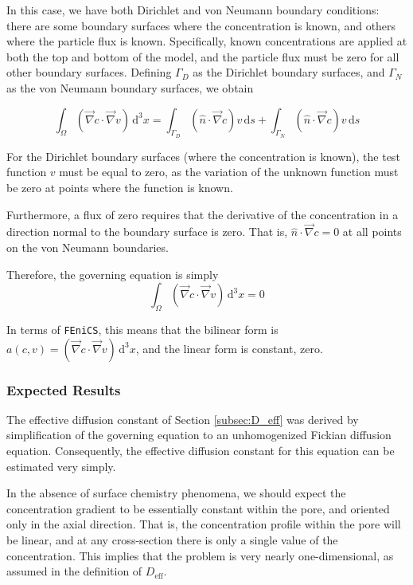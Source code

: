 In this case, we have both Dirichlet and von Neumann boundary conditions:
there are some boundary surfaces where the concentration is known,
and others where the particle flux is known.
Specifically, known concentrations are applied at both the top and bottom of the model,
and the particle flux must be zero for all other boundary surfaces.
Defining $\Gamma_D$ as the Dirichlet boundary surfaces,
and $\Gamma_N$ as the von Neumann boundary surfaces, we obtain

\begin{equation}
\int_{\Omega} \left( \vec{\nabla}c \cdot \vec{\nabla}v \right) \,\mathrm{d}^3x =
\int_{\Gamma_D} \left( \hat{n} \cdot \vec{\nabla} c \right) v\,\mathrm{d}s
+\int_{\Gamma_N} \left( \hat{n} \cdot \vec{\nabla} c \right) v\,\mathrm{d}s
\end{equation}

For the Dirichlet boundary surfaces (where the concentration is known),
the test function $v$ must be equal to zero,
as the variation of the unknown function must be zero at points where the function is known.

Furthermore, a flux of zero requires that the derivative of the concentration in a direction
normal to the boundary surface is zero.
That is, $\hat{n} \cdot \vec{\nabla} c = 0$ at all points on the von Neumann boundaries.

Therefore, the governing equation is simply
\begin{equation}
\int_{\Omega} \left( \vec{\nabla}c \cdot \vec{\nabla}v \right) \,\mathrm{d}^3x = 0
\end{equation}

In terms of \texttt{FEniCS}, this means that the bilinear form is
$a(c,v)=\left( \vec{\nabla}c \cdot \vec{\nabla}v \right) \,\mathrm{d}^3x$,
and the linear form is constant, zero.


\subsubsection{Expected Results}\label{subsubsec:unhom_fick_expected}

The effective diffusion constant of Section \ref{subsec:D_eff}
was derived by simplification of the governing equation
to an unhomogenized Fickian diffusion equation.
Consequently, the effective diffusion constant for this equation
can be estimated very simply.

In the absence of surface chemistry phenomena,
we should expect the concentration gradient
to be essentially constant within the pore, and oriented only in the axial direction.
That is, the concentration profile within the pore will be linear,
and at any cross-section there is only a single value of the concentration.
This implies that the problem is very nearly one-dimensional,
as assumed in the definition of $D_{\mathrm{eff}}$.


